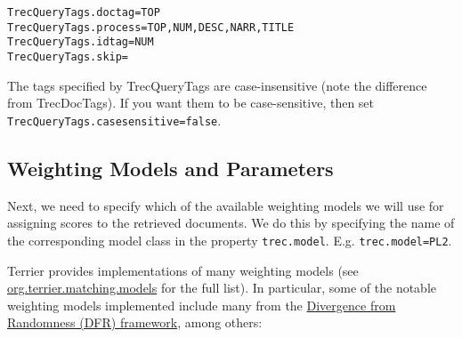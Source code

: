 \begin{verbatim}
TrecQueryTags.doctag=TOP
TrecQueryTags.process=TOP,NUM,DESC,NARR,TITLE
TrecQueryTags.idtag=NUM
TrecQueryTags.skip=
\end{verbatim}

The tags specified by TrecQueryTags are case-insensitive (note the
difference from TrecDocTags). If you want them to be case-sensitive,
then set \texttt{TrecQueryTags.casesensitive=false}.

\subsection{Weighting Models and
Parameters}\label{weighting-models-and-parameters}

Next, we need to specify which of the available weighting models we will
use for assigning scores to the retrieved documents. We do this by
specifying the name of the corresponding model class in the property
\texttt{trec.model}. E.g. \texttt{trec.model=PL2}.

Terrier provides implementations of many weighting models (see
\href{javadoc/org/terrier/matching/models/package-summary.html}{org.terrier.matching.models}
for the full list). In particular, some of the notable weighting models
implemented include many from the \href{dfr_description.html}{Divergence
from Randomness (DFR) framework}, among others:

